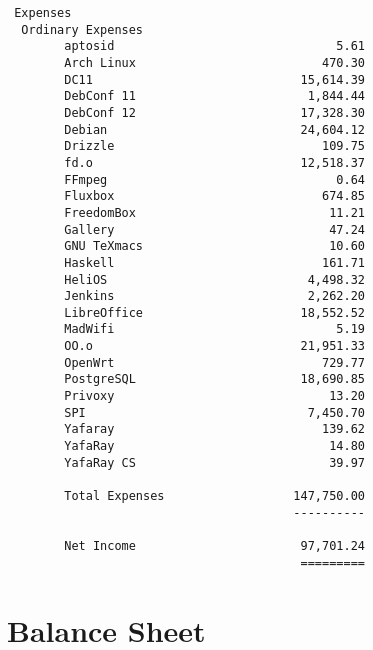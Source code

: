 \documentclass[letterpaper]{report}
\begin{document}
\begin{verbatim}
 Expenses
  Ordinary Expenses
        aptosid                               5.61
        Arch Linux                          470.30
        DC11                             15,614.39
        DebConf 11                        1,844.44
        DebConf 12                       17,328.30
        Debian                           24,604.12
        Drizzle                             109.75
        fd.o                             12,518.37
        FFmpeg                                0.64
        Fluxbox                             674.85
        FreedomBox                           11.21
        Gallery                              47.24
        GNU TeXmacs                          10.60
        Haskell                             161.71
        HeliOS                            4,498.32
        Jenkins                           2,262.20
        LibreOffice                      18,552.52
        MadWifi                               5.19
        OO.o                             21,951.33
        OpenWrt                             729.77
        PostgreSQL                       18,690.85
        Privoxy                              13.20
        SPI                               7,450.70
        Yafaray                             139.62
        YafaRay                              14.80
        YafaRay CS                           39.97

        Total Expenses                  147,750.00
                                        ----------

        Net Income                       97,701.24
                                         =========
\end{verbatim}

\section{Balance Sheet}
\end{document}
